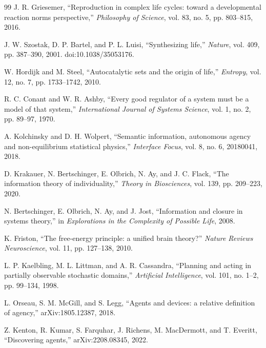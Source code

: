 \documentclass[11pt]{article}
\begin{document}
\begin{thebibliography}{99}
J. R. Griesemer, ``Reproduction in complex life cycles: toward a developmental reaction norms perspective,'' \emph{Philosophy of Science}, vol. 83, no. 5, pp. 803--815, 2016.

J. W. Szostak, D. P. Bartel, and P. L. Luisi, ``Synthesizing life,'' \emph{Nature}, vol. 409, pp. 387--390, 2001. doi:10.1038/35053176.

W. Hordijk and M. Steel, ``Autocatalytic sets and the origin of life,'' \emph{Entropy}, vol. 12, no. 7, pp. 1733--1742, 2010.

R. C. Conant and W. R. Ashby, ``Every good regulator of a system must be a model of that system,'' \emph{International Journal of Systems Science}, vol. 1, no. 2, pp. 89--97, 1970.

A. Kolchinsky and D. H. Wolpert, ``Semantic information, autonomous agency and non-equilibrium statistical physics,'' \emph{Interface Focus}, vol. 8, no. 6, 20180041, 2018.

D. Krakauer, N. Bertschinger, E. Olbrich, N. Ay, and J. C. Flack, ``The information theory of individuality,'' \emph{Theory in Biosciences}, vol. 139, pp. 209--223, 2020.

N. Bertschinger, E. Olbrich, N. Ay, and J. Jost, ``Information and closure in systems theory,'' in \emph{Explorations in the Complexity of Possible Life}, 2008.

K. Friston, ``The free-energy principle: a unified brain theory?'' \emph{Nature Reviews Neuroscience}, vol. 11, pp. 127--138, 2010.

L. P. Kaelbling, M. L. Littman, and A. R. Cassandra, ``Planning and acting in partially observable stochastic domains,'' \emph{Artificial Intelligence}, vol. 101, no. 1--2, pp. 99--134, 1998.

L. Orseau, S. M. McGill, and S. Legg, ``Agents and devices: a relative definition of agency,'' arXiv:1805.12387, 2018.

Z. Kenton, R. Kumar, S. Farquhar, J. Richens, M. MacDermott, and T. Everitt, ``Discovering agents,'' arXiv:2208.08345, 2022.

\end{thebibliography}
\end{document}
